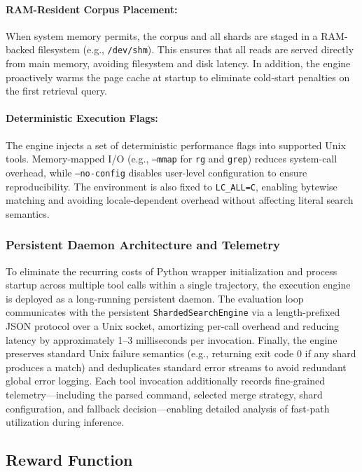 \documentclass{llmxive}
\begin{document}
\paragraph{RAM-Resident Corpus Placement:} When system memory permits, the corpus and all shards are staged in a RAM-backed filesystem (e.g., \texttt{/dev/shm}). This ensures that all reads are served directly from main memory, avoiding filesystem and disk latency. In addition, the engine proactively warms the page cache at startup to eliminate cold-start penalties on the first retrieval query.

\paragraph{Deterministic Execution Flags:} The engine injects a set of deterministic performance flags into supported Unix tools. Memory-mapped I/O (e.g., \texttt{--mmap} for \texttt{rg} and \texttt{grep}) reduces system-call overhead, while \texttt{--no-config} disables user-level configuration to ensure reproducibility. The environment is also fixed to \texttt{LC\_ALL=C}, enabling bytewise matching and avoiding locale-dependent overhead without affecting literal search semantics.

\subsubsection{Persistent Daemon Architecture and Telemetry}

To eliminate the recurring costs of Python wrapper initialization and process startup across multiple tool calls within a single trajectory, the execution engine is deployed as a long-running persistent daemon. The evaluation loop communicates with the persistent \texttt{ShardedSearchEngine} via a length-prefixed JSON protocol over a Unix socket, amortizing per-call overhead and reducing latency by approximately 1--3 milliseconds per invocation. Finally, the engine preserves standard Unix failure semantics (e.g., returning exit code 0 if any shard produces a match) and deduplicates standard error streams to avoid redundant global error logging. Each tool invocation additionally records fine-grained telemetry---including the parsed command, selected merge strategy, shard configuration, and fallback decision---enabling detailed analysis of fast-path utilization during inference.





\subsection{Reward Function}
\label{app:reward}
\end{document}
